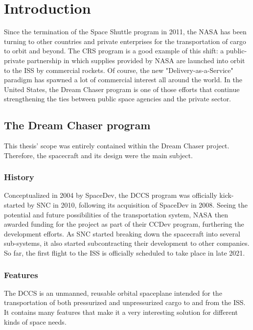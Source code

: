 \setlength{\parindent}{2em}
\chapter{Introduction}\label{cha:intro}
Since the termination of the Space Shuttle program in 2011, the \gls{NASA} has been turning to other countries and private enterprises for the transportation of cargo to orbit and beyond. The \gls{CRS} program is a good example of this shift: a public-private partnership in which supplies provided by NASA are launched into orbit to the \gls{ISS} by commercial rockets. Of course, the new "Delivery-as-a-Service" paradigm has spawned a lot of commercial interest all around the world. In the United States, the Dream Chaser program is one of those efforts that continue strengthening the ties between public space agencies and the private sector.

\section{The Dream Chaser program}
This thesis' scope was entirely contained within the Dream Chaser project. Therefore, the spacecraft and its design were the main subject. 
\subsection*{History}
Conceptualized in 2004 by SpaceDev, the \gls{DCCS} program was officially kick-started by \gls{SNC} in 2010, following its acquisition of SpaceDev in 2008\cite{online:fikes}. Seeing the potential and future possibilities of the transportation system, NASA then awarded funding for the project as part of their \gls{CCDev} program, furthering the development efforts. As \gls{SNC} started breaking down the spacecraft into several sub-systems, it also started subcontracting their development to other companies. So far, the first flight to the \gls{ISS} is officially scheduled to take place in late 2021\cite{online:kanayama}.

\subsection*{Features}
The \gls{DCCS} is an unmanned, reusable orbital spaceplane intended for the transportation of both pressurized and unpressurized cargo to and from the \gls{ISS}. It contains many features that make it a very interesting solution for different kinds of space needs. 

